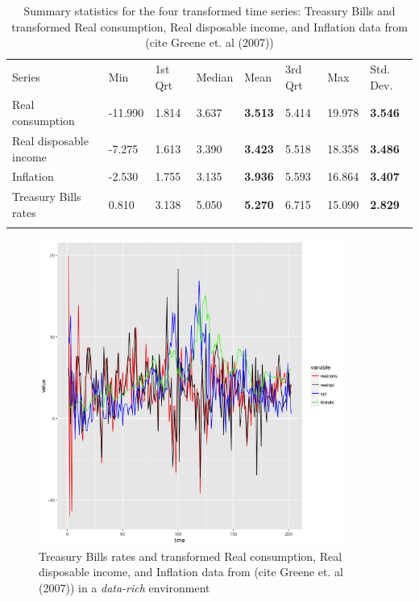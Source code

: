 \begin{table}
\begin{center}
\caption{Summary statistics for the four transformed time series: Treasury Bills and transformed Real consumption, Real disposable income, and  Inflation data from (cite Greene et. al (2007))}
\label{tab:summary_four_ts}       %
\begin{tabular}{llllllll}
\hline\noalign{\smallskip}
Series & Min & 1st Qrt  & Median  & Mean & 3rd Qrt  & Max & Std. Dev.\\
\noalign{\smallskip}\hline\noalign{\smallskip}
  Real consumption  & -11.990 & 1.814 & 3.637 & \textbf{3.513} & 5.414 & 19.978 & \textbf{3.546}\\
  Real disposable income  & -7.275 & 1.613 & 3.390 & \textbf{3.423} & 5.518 & 18.358 & \textbf{3.486}\\
  Inflation & -2.530  & 1.755 & 3.135 & \textbf{3.936} & 5.593 & 16.864 & \textbf{3.407}\\
  Treasury Bills rates & 0.810  & 3.138 & 5.050 & \textbf{5.270} & 6.715 & 15.090 & \textbf{2.829} \\
\noalign{\smallskip}\hline
\end{tabular}
\end{center}
\end{table}

\begin{figure}[!htb]
\centering
\includegraphics[width=10cm]{gfx/chapter-rvfl-ensembles/all_series.png}
\caption{Treasury Bills rates and transformed Real consumption, Real disposable income, and  Inflation data from (cite Greene et. al (2007)) in a \textit{data-rich} environment}
\label{all_series_plot}
\end{figure}


